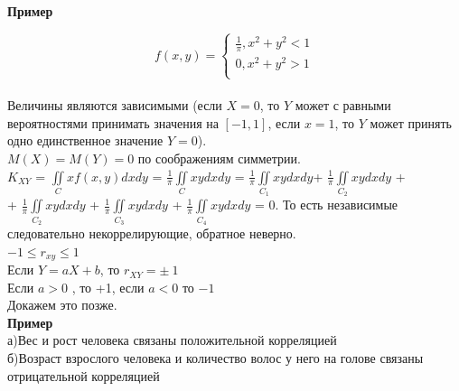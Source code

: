 \documentclass[russian, 12pt, fleqn]{article}
\begin{document}
\textbf{Пример}\\
\begin{equation*} 
f(x, y)=
 \begin{cases}
   \frac{1}{\pi},   x^2 + y^2 < 1\\
   0 , x^2 + y^2 > 1\\
 \end{cases}
\end{equation*}\\
Величины являются зависимыми (если $X  = 0$, то $Y$ может с равными вероятностями принимать значения на $[-1, 1]$, если $x=1$, то $Y$ может принять одно единственное значение $Y=0$).\\
$M(X)=M(Y) = 0$ по соображениям симметрии.\\
$K_{XY}$ = $\displaystyle{\iint\limits_{C}^{}} xf(x, y)dxdy$ =  $\frac{1}{\pi} \displaystyle{\iint\limits_{C}^{}} xy dxdy$ = $\frac{1}{\pi} \displaystyle{\iint\limits_{C_1}^{}} xy dxdy$+ $\frac{1}{\pi} \displaystyle{\iint\limits_{C_2}^{}} xy dxdy$ +\\+ $\frac{1}{\pi} \displaystyle{\iint\limits_{C_2}^{}} xy dxdy$ + $\frac{1}{\pi} \displaystyle{\iint\limits_{C_3}^{}} xy dxdy$ + $\frac{1}{\pi} \displaystyle{\iint\limits_{C_4}^{}} xy dxdy$ = $0$.
То есть независимые следовательно некоррелирующие, обратное неверно.\\
$-1\leq r_{xy} \leq 1$\\
Если $Y=aX+b$, то $r_{XY} = \pm \ 1$\\
Если $a>0$   , то +1, если $a<0$ то $-1$\\
Докажем это позже.\\
\textbf{Пример}\\
а)Вес и рост человека связаны положительной корреляцией\\
б)Возраст взрослого человека и количество волос у него на голове связаны отрицательной корреляцией\\
\end{document}
